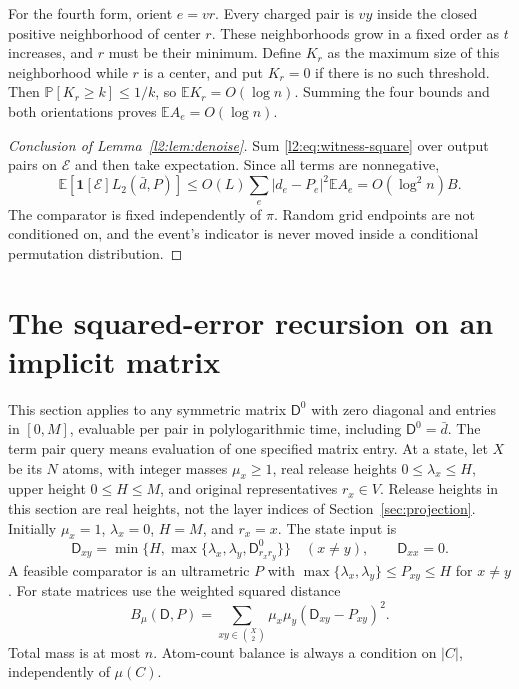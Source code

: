 \documentclass[11pt]{article}
\theoremstyle{definition}
\newcommand{\E}{\mathbb E}
\newcommand{\Prb}{\mathbb P}
\newcommand{\ind}{\mathbf 1}
\begin{document}
For the fourth form, orient $e=vr$. Every charged pair is $vy$ inside
the closed positive neighborhood of center $r$. These neighborhoods
grow in a fixed order as $t$ increases, and $r$ must be their minimum.
Define $K_r$ as the maximum size of this neighborhood while $r$ is
a center, and put $K_r=0$ if there is no such threshold. Then
$\Prb[K_r\ge k]\le1/k$, so $\E K_r=O(\log n)$.
Summing the four bounds and both orientations proves $\E A_e=O(\log n)$.

\begin{proof}[Conclusion of Lemma~\ref{l2:lem:denoise}]
Sum \eqref{l2:eq:witness-square} over output pairs on $\mathcal E$ and
then take expectation. Since all terms are nonnegative,
\[
 \E[\ind[\mathcal E]L_2(\bar d,P)]
 \le O(L)\sum_e |d_e-P_e|^2\E A_e
 =O(\log^2 n)B.
\]
The comparator is fixed independently of $\pi$. Random grid endpoints
are not conditioned on, and the event's indicator is never moved
inside a conditional permutation distribution.
\end{proof}

\section{The squared-error recursion on an implicit matrix}

This section applies to any symmetric matrix $\mathsf D^0$ with zero diagonal and entries in $[0,M]$, evaluable per pair in polylogarithmic time, including $\mathsf D^0=\bar d$. The term pair query means evaluation of one specified matrix entry.
At a state, let $X$ be its $N$ atoms, with integer masses $\mu_x\ge1$,
real release heights $0\le\lambda_x\le H$, upper height $0\le H\le M$, and original representatives $r_x\in V$. Release heights in this section are real heights, not the layer indices of Section~\ref{sec:projection}.
Initially $\mu_x=1$, $\lambda_x=0$, $H=M$, and $r_x=x$.
The state input is
\begin{equation}\label{l2:eq:state-input}
 \mathsf D_{xy}=\min\{H,\max\{\lambda_x,\lambda_y,\mathsf D^0_{r_xr_y}\}\}
 \quad(x\ne y),\qquad \mathsf D_{xx}=0.
\end{equation}
A feasible comparator is an ultrametric $P$ with
$\max\{\lambda_x,\lambda_y\}\le P_{xy}\le H$ for $x\ne y$.
For state matrices use the weighted squared distance
\[
 B_\mu(\mathsf D,P)=\sum_{xy\in\binom X2}\mu_x\mu_y(\mathsf D_{xy}-P_{xy})^2.
\]
Total mass is at most $n$. Atom-count balance is always a condition
on $|C|$, independently of $\mu(C)$.
\end{document}
